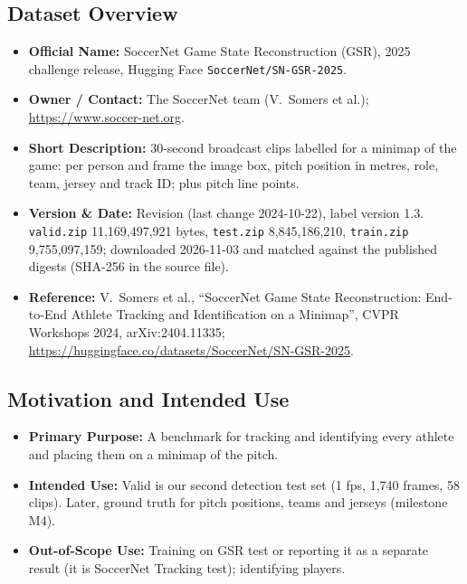 \documentclass[11pt, a4paper]{article}
\begin{document}
\subsection{Dataset Overview}
\begin{itemize}
    \item \textbf{Official Name:} SoccerNet Game State Reconstruction (GSR), 2025 challenge release, Hugging Face \texttt{SoccerNet/SN-GSR-2025}.
    \item \textbf{Owner / Contact:} The SoccerNet team (V.~Somers et al.); \url{https://www.soccer-net.org}.
    \item \textbf{Short Description:} 30-second broadcast clips labelled for a minimap of the game: per person and frame the image box, pitch position in metres, role, team, jersey and track ID; plus pitch line points.
    \item \textbf{Version \& Date:} Revision  (last change 2024-10-22), label version 1.3. \texttt{valid.zip} 11,169,497,921 bytes, \texttt{test.zip} 8,845,186,210, \texttt{train.zip} 9,755,097,159; downloaded 2026-11-03 and matched against the published digests (SHA-256 in the source file).
    \item \textbf{Reference:} V.~Somers et al., ``SoccerNet Game State Reconstruction: End-to-End Athlete Tracking and Identification on a Minimap'', CVPR Workshops 2024, arXiv:2404.11335; \url{https://huggingface.co/datasets/SoccerNet/SN-GSR-2025}.
\end{itemize}

\subsection{Motivation and Intended Use}
\begin{itemize}
    \item \textbf{Primary Purpose:} A benchmark for tracking and identifying every athlete and placing them on a minimap of the pitch.
    \item \textbf{Intended Use:} Valid is our second detection test set (1 fps, 1,740 frames, 58 clips). Later, ground truth for pitch positions, teams and jerseys (milestone M4).
    \item \textbf{Out-of-Scope Use:} Training on GSR test or reporting it as a separate result (it is SoccerNet Tracking test); identifying players.
\end{itemize}
\end{document}

